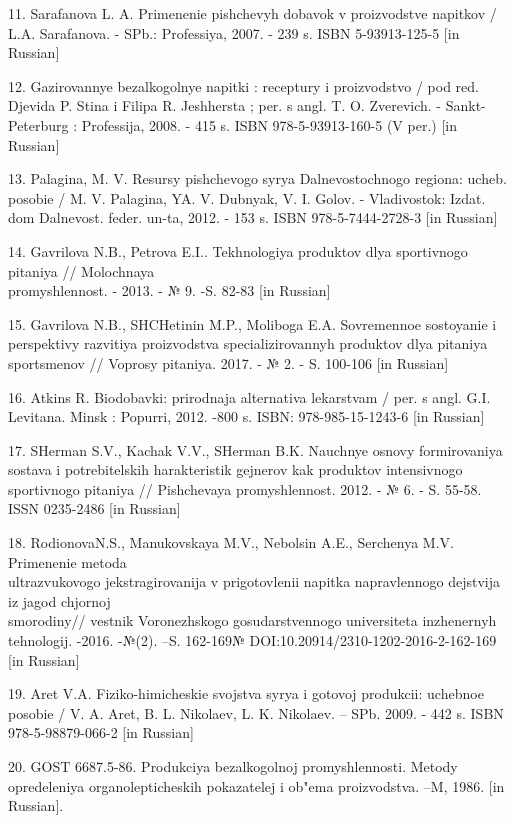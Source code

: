 \begin{noparindent}
11. Sarafanova L. A. Primenenie pishchevyh dobavok v proizvodstve
napitkov / L.A. Sarafanova. - SPb.: Professiya, 2007. - 239 s. ISBN
5-93913-125-5 {[}in Russian{]}

12. Gazirovannye bezalkogol\textquotesingle nye napitki : receptury i
proizvodstvo / pod red. Djevida P. Stina i Filipa R. Jeshhersta ; per. s
angl. T. O. Zverevich. - Sankt-Peterburg : Professija, 2008. - 415 s.
ISBN 978-5-93913-160-5 (V per.) {[}in Russian{]}

13. Palagina, M. V. Resursy pishchevogo syr\textquotesingle ya
Dal\textquotesingle nevostochnogo regiona: ucheb. posobie / M. V.
Palagina, YA. V. Dubnyak, V. I. Golov. - Vladivostok: Izdat. dom
Dal\textquotesingle nevost. feder. un-ta, 2012. - 153 s. ISBN
978-5-7444-2728-3 {[}in Russian{]}

14. Gavrilova N.B., Petrova E.I.. Tekhnologiya produktov dlya
sportivnogo pitaniya // Molochnaya \\promyshlennost\textquotesingle. -
2013. - № 9. -S. 82-83 {[}in Russian{]}

15. Gavrilova N.B., SHCHetinin M.P., Moliboga E.A. Sovremennoe
sostoyanie i perspektivy razvitiya proizvodstva specializirovannyh
produktov dlya pitaniya sportsmenov // Voprosy pitaniya. 2017. - № 2. -
S. 100-106 {[}in Russian{]}

16. Atkins R. Biodobavki: prirodnaja al\textquotesingle ternativa
lekarstvam / per. s angl. G.I. Levitana. Minsk : Popurri, 2012. -800 s.
ISBN: 978-985-15-1243-6 {[}in Russian{]}

17. SHerman S.V., Kachak V.V., SHerman B.K. Nauchnye osnovy
formirovaniya sostava i potrebitel\textquotesingle skih harakteristik
gejnerov kak produktov intensivnogo sportivnogo pitaniya // Pishchevaya
promyshlennost\textquotesingle. 2012. - № 6. - S. 55-58. ISSN 0235-2486
{[}in Russian{]}

18. RodionovaN.S., Manukovskaya M.V., Nebol\textquotesingle sin A.E.,
Serchenya M.V. Primenenie metoda \\ul\textquotesingle trazvukovogo
jekstragirovanija v prigotovlenii napitka napravlennogo dejstvija iz
jagod chjornoj \\smorodiny// vestnik Voronezhskogo gosudarstvennogo
universiteta inzhenernyh tehnologij. -2016. -№(2). --S. 162-169№
DOI:10.20914/2310-1202-2016-2-162-169 {[}in Russian{]}

19. Aret V.A. Fiziko-himicheskie svojstva syr\textquotesingle ya i
gotovoj produkcii: uchebnoe posobie / V. A. Aret, B. L. Nikolaev, L. K.
Nikolaev. -- SPb. 2009. - 442 s. ISBN 978-5-98879-066-2 {[}in Russian{]}

20. GOST 6687.5-86. Produkciya bezalkogol\textquotesingle noj
promyshlennosti. Metody opredeleniya organolepticheskih pokazatelej i
ob"ema proizvodstva. --M, 1986. {[}in Russian{]}.

\end{noparindent}

